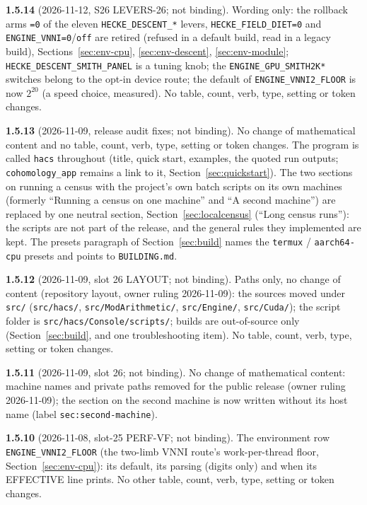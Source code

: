 \documentclass[11pt,openany]{report}
\newcommand{\file}[1]{\nolinkurl{#1}}
\begin{document}
\textbf{1.5.14} (2026-11-12, S26 LEVERS-26; not binding). Wording only: the rollback arms \texttt{=0} of the eleven
\texttt{HECKE\_DESCENT\_*} levers, \texttt{HECKE\_FIELD\_DIET=0} and \texttt{ENGINE\_VNNI=0}/\texttt{off} are retired (refused in a default
build, read in a legacy build), Sections~\ref{sec:env-cpu}, \ref{sec:env-descent}, \ref{sec:env-module};
\texttt{HECKE\_DESCENT\_SMITH\_PANEL} is a tuning knob; the \texttt{ENGINE\_GPU\_SMITH2K*} switches belong to the opt-in device route;
the default of \texttt{ENGINE\_VNNI2\_FLOOR} is now $2^{20}$ (a speed choice, measured).
No table, count, verb, type, setting or token changes.

\textbf{1.5.13} (2026-11-09, release audit fixes; not binding). No change of mathematical content and no table, count,
verb, type, setting or token changes. The program is called \texttt{hacs} throughout (title, quick start, examples, the
quoted run outputs; \texttt{cohomology\_app} remains a link to it, Section~\ref{sec:quickstart}). The two sections on
running a census with the project's own batch scripts on its own machines (formerly ``Running a census on one machine''
and ``A second machine'') are replaced by one neutral section, Section~\ref{sec:localcensus} (``Long census runs''): the
scripts are not part of the release, and the general rules they implemented are kept. The presets paragraph of
Section~\ref{sec:build} names the \texttt{termux} / \texttt{aarch64-cpu} presets and points to \file{BUILDING.md}.

\textbf{1.5.12} (2026-11-09, slot 26 LAYOUT; not binding). Paths only, no change of content (repository layout, owner
ruling 2026-11-09): the sources moved under \file{src/} (\file{src/hacs/}, \file{src/ModArithmetic/},
\file{src/Engine/}, \file{src/Cuda/}); the script folder is \file{src/hacs/Console/scripts/}; builds are out-of-source
only (Section~\ref{sec:build}, and one troubleshooting item). No table, count, verb, type, setting or token changes.

\textbf{1.5.11} (2026-11-09, slot 26; not binding). No change of mathematical content: machine names and private paths removed for the public release (owner ruling 2026-11-09); the section on the second machine is now written without its host name (label \texttt{sec:second-machine}).

\textbf{1.5.10} (2026-11-08, slot-25 PERF-VF; not binding). The environment row \texttt{ENGINE\_VNNI2\_FLOOR} (the two-limb VNNI route's
work-per-thread floor, Section~\ref{sec:env-cpu}): its default, its parsing (digits only) and when its EFFECTIVE line prints. No other
table, count, verb, type, setting or token changes.
\end{document}
